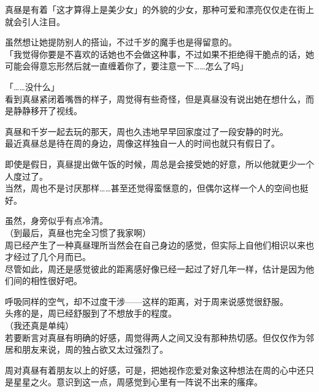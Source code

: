 真昼是有着「这才算得上是美少女」的外貌的少女，那种可爱和漂亮仅仅走在街上就会引人注目。

虽然想让她提防别人的搭讪，不过千岁的魔手也是得留意的。\\

「我觉得你要是不喜欢的话她也不会做这种事，不过如果不拒绝得干脆点的话，她可能会得意忘形然后就一直缠着你了，要注意一下……怎么了吗」

「……没什么」\\

看到真昼紧闭着嘴唇的样子，周觉得有些奇怪，但是真昼没有说出她在想什么，而是静静移开了视线。\\

\vspace{2\baselineskip}

真昼和千岁一起去玩的那天，周也久违地早早回家度过了一段安静的时光。\\

最近真昼总是待在周的身边，周像这样独自一人的时间也就只有假日了。

即使是假日，真昼提出做午饭的时候，周总是会接受她的好意，所以他就更少一个人度过了。\\

当然，周也不是讨厌那样……甚至还觉得蛮惬意的，但偶尔这样一个人的空间也挺好。

虽然，身旁似乎有点冷清。\\

（到最后，真昼也完全习惯了我家啊）\\

周已经产生了一种真昼理所当然会在自己身边的感觉，但实际上自他们相识以来也才经过了几个月而已。\\

尽管如此，周还是感觉彼此的距离感好像已经一起过了好几年一样，估计是因为他们间的相性很好吧。

呼吸同样的空气，却不过度干涉——这样的距离，对于周来说感觉很舒服。\\

头疼的是，周已经舒服到了不想放手的程度。\\

（我还真是单纯）\\

若要断言对真昼有明确的好感，周觉得两人之间又没有那种热切感。但仅仅作为邻居和朋友来说，周的独占欲又太过强烈了。

周对真昼有着朋友以上的好感，可是，把她视作恋爱对象这种想法在周的心中还只是星星之火。意识到这一点，周感觉到心里有一阵说不出来的瘙痒。\\%

